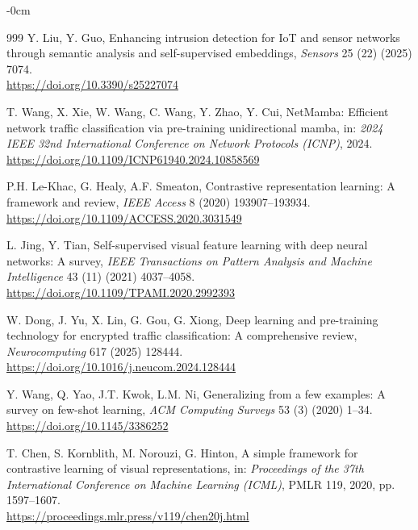\documentclass[sensors,article,submit,moreauthors]{Definitions/mdpi}
\begin{document}
\begin{adjustwidth}{-\extralength}{0cm}
\begin{thebibliography}{999}
Y. Liu, Y. Guo, Enhancing intrusion detection for IoT and sensor networks through semantic analysis and self-supervised embeddings, \textit{Sensors} 25 (22) (2025) 7074. \\
\url{https://doi.org/10.3390/s25227074}



T. Wang, X. Xie, W. Wang, C. Wang, Y. Zhao, Y. Cui, NetMamba: Efficient network traffic classification via pre-training unidirectional mamba, in: \textit{2024 IEEE 32nd International Conference on Network Protocols (ICNP)}, 2024. \\
\url{https://doi.org/10.1109/ICNP61940.2024.10858569}



P.H. Le-Khac, G. Healy, A.F. Smeaton, Contrastive representation learning: A framework and review, \textit{IEEE Access} 8 (2020) 193907--193934. \\
\url{https://doi.org/10.1109/ACCESS.2020.3031549}



L. Jing, Y. Tian, Self-supervised visual feature learning with deep neural networks: A survey, \textit{IEEE Transactions on Pattern Analysis and Machine Intelligence} 43 (11) (2021) 4037--4058. \\
\url{https://doi.org/10.1109/TPAMI.2020.2992393}



W. Dong, J. Yu, X. Lin, G. Gou, G. Xiong, Deep learning and pre-training technology for encrypted traffic classification: A comprehensive review, \textit{Neurocomputing} 617 (2025) 128444. \\
\url{https://doi.org/10.1016/j.neucom.2024.128444}



Y. Wang, Q. Yao, J.T. Kwok, L.M. Ni, Generalizing from a few examples: A survey on few-shot learning, \textit{ACM Computing Surveys} 53 (3) (2020) 1--34. \\
\url{https://doi.org/10.1145/3386252}



T. Chen, S. Kornblith, M. Norouzi, G. Hinton, A simple framework for contrastive learning of visual representations, in: \textit{Proceedings of the 37th International Conference on Machine Learning (ICML)}, PMLR 119, 2020, pp. 1597--1607. \\
\url{https://proceedings.mlr.press/v119/chen20j.html}




\end{thebibliography}
\end{adjustwidth}
\end{document}
